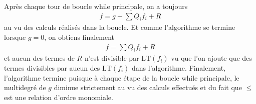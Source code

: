             \begin{remq}
                Après chaque tour de boucle while principale, on a toujours 
                \begin{align*}
                    f = g + \sum Q_if_i + R
                \end{align*}
                au vu des calculs réalisés dans la boucle. Et comme l'algorithme se termine lorsque $g = 0$, on obtiens finalement 
                \begin{align*}
                    f = \sum Q_if_i + R
                \end{align*}
                et aucun des termes de $R$ n'est divisible par $\mathrm{LT}(f_i)$ vu que l'on ajoute que des termes divisibles par aucun des $\mathrm{LT}(f_i)$ dans l'algorithme. Finalement, l'algorithme termine puisque à chaque étape de la boucle while principale, le multidegré de $g$ diminue strictement au vu des calculs effectués et du fait que $\leq$ est une relation d'ordre monomiale.
            \end{remq}
